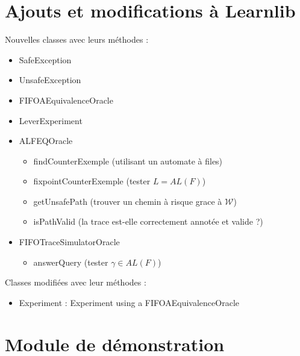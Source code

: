 \section{Ajouts et modifications à Learnlib}
Nouvelles classes avec leurs méthodes :
\begin{itemize}
  \item SafeException
  \item UnsafeException
  \item FIFOAEquivalenceOracle
  \item LeverExperiment
  \item ALFEQOracle
    \begin{itemize}
      \item findCounterExemple (utilisant un automate à files)
      \item fixpointCounterExemple (tester $L=AL(F)$)
      \item getUnsafePath (trouver un chemin à risque grace à $\mathcal{W}$)
      \item isPathValid (la trace est-elle correctement annotée et valide ?)
    \end{itemize}
  \item FIFOTraceSimulatorOracle
    \begin{itemize}
      \item answerQuery (tester $\gamma\in AL(F)$)
    \end{itemize}
\end{itemize}

Classes modifiées avec leur méthodes :
\begin{itemize}
  \item Experiment : Experiment using a FIFOAEquivalenceOracle
\end{itemize}


\section{Module de démonstration}


